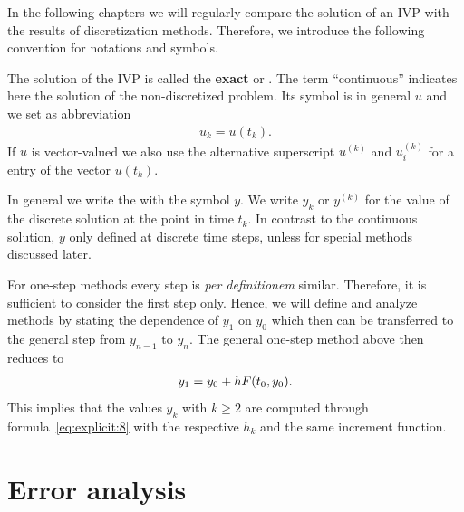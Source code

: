 \begin{definition}
  In the following chapters we will regularly compare the solution of
  an IVP with the results of discretization methods. Therefore, we
  introduce the following convention for notations and symbols.
  
   The solution
  of the IVP is called the \textbf{exact} or . The term ``continuous''
  indicates here the solution of the non-discretized problem. Its
  symbol is in general $u$ and we set as abbreviation
  \begin{gather*}
    u_k = u(t_k).
  \end{gather*}
  If $u$ is vector-valued we also use the alternative superscript
  $u^{(k)}$ and $u_i^{(k)}$ for a entry of the vector $u(t_k)$.

   In general we write the
   with the
  symbol $y$. We write $y_k$ or $y^{(k)}$ for the value of the
  discrete solution at the point in time $t_k$. In contrast to the
  continuous solution, $y$ only defined at discrete time steps, unless
  for special methods discussed later.
\end{definition}



\begin{remark}
  \label{remark:expl:first-step}
  For one-step methods every step is \emph{per definitionem} similar.
  Therefore, it is sufficient to consider the first step only.  Hence,
  we will define and analyze methods by stating the dependence of
  $y_1$ on $y_0$ which then can be transferred to the general step
  from $y_{n-1}$ to $y_{n}$. The general one-step method above then
  reduces to
  \begin{gather*}
    y_1 = y_0 + h F(t_0, y_0).
  \end{gather*}
  This implies that the values $y_k$ with $k\ge 2$ are computed
  through formula~\eqref{eq:explicit:8} with the respective $h_k$ and
  the same increment function.
\end{remark}



\section{Error analysis}

